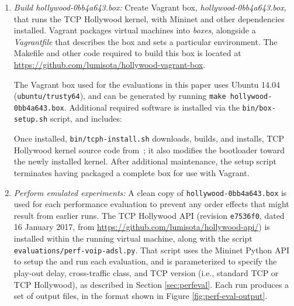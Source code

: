 \begin{enumerate}
  \item \emph{Build hollywood-0bb4a643.box:}
     Create Vagrant box, \emph{hollywood-0bb4a643.box}, that runs the TCP Hollywood
     kernel, with Mininet and other dependencies installed. Vagrant packages
     virtual machines into \emph{boxes}, alongside a \emph{Vagrantfile} that
     describes the box and sets a particular environment. The Makefile and other
     code required to build this box is located at
     \url{https://github.com/lumisota/hollywood-vagrant-box}.

    The Vagrant box used for the evaluations in this paper uses Ubuntu 14.04 (\texttt{ubuntu/trusty64}), and can be generated by running \texttt{make hollywood-0bb4a643.box}. Additional required software is installed via the \texttt{bin/box-setup.sh} script, and includes:
    Once installed, \texttt{bin/tcph-install.sh} downloads, builds, and
    installs, TCP Hollywood kernel source code from~\cite{hollywood-src}; it
    also modifies the bootloader toward the newly installed kernel. After
    additional maintenance, the setup script terminates having packaged a
    complete box for use with Vagrant.


\balance
    \item \emph{Perform emulated experiments:}
          A clean copy of \texttt{hollywood-0bb4a643.box} is used for each
          performance evaluation to prevent any order effects that
          might result from earlier runs. The TCP Hollywood API
          (revision \texttt{e7536f0}, dated 16 January 2017, from \url{https://github.com/lumisota/hollywood-api/})
          is installed within the running
          virtual machine, along with the script
          \texttt{evaluations/perf-voip-adsl.py}. That script uses the Mininet
          Python API to setup the and run each evaluation, and is parameterized
          to specify the play-out delay, cross-traffic class, and TCP version
          (i.e., standard TCP or TCP Hollywood), as described in Section \ref{sec:perfeval}. Each run
          produces a set of output files, in the format shown in Figure
          \ref{fig:perf-eval-output}.


\end{enumerate}
